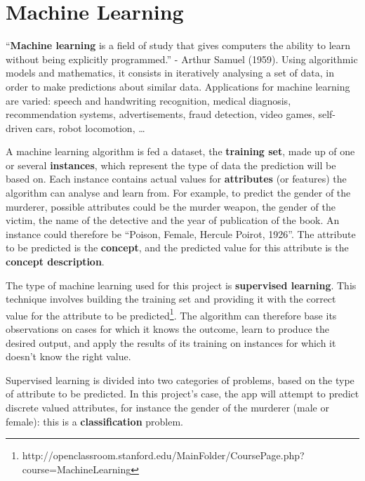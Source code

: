 \documentclass{mproj}
\begin{document}
\section{Machine Learning}
``\textbf{Machine learning} is a field of study that gives computers the ability to learn without being explicitly programmed.'' - Arthur Samuel (1959). \cite{quotearthursamuel} Using algorithmic models and mathematics, it consists in iteratively analysing a set of data, in order to make predictions about similar data. Applications for machine learning are varied: speech and handwriting recognition, medical diagnosis, recommendation systems, advertisements, fraud detection, video games, self-driven cars, robot locomotion, \ldots \par 

A machine learning algorithm is fed a dataset, the \textbf{training set}, made up of one or several \textbf{instances}, which represent the type of data the prediction will be based on. Each instance contains actual values for \textbf{attributes} (or features) the algorithm can analyse and learn from. For example, to predict the gender of the murderer, possible attributes could be the murder weapon, the gender of the victim, the name of the detective and the year of publication of the book. An instance could therefore be ``Poison, Female, Hercule Poirot, 1926''. The attribute to be predicted is the \textbf{concept}, and the predicted value for this attribute is the \textbf{concept description}. \par 

The type of machine learning used for this project is \textbf{supervised learning}. This technique involves building the training set and providing it with the correct value for the attribute to be predicted\footnote{http://openclassroom.stanford.edu/MainFolder/CoursePage.php?course=MachineLearning}. The algorithm can therefore base its observations on cases for which it knows the outcome, learn to produce the desired output, and apply the results of its training on instances for which it doesn't know the right value. \par

Supervised learning is divided into two categories of problems, based on the type of attribute to be predicted. In this project's case, the app will attempt to predict discrete valued attributes, for instance the gender of the murderer (male or female): this is a \textbf{classification} problem. 


\end{document}
